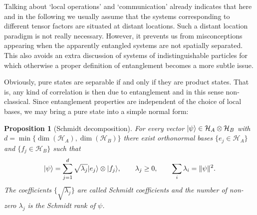 \documentclass[11pt,a4paper]{article}
\theoremstyle{plain}
\newtheorem{proposition}{Proposition}[section]
\theoremstyle{definition}
\theoremstyle{remark}
\numberwithin{equation}{section}
\begin{document}
Talking about `local operations' and `communication' already indicates that here and in the following we usually assume that the systems corresponding to different tensor factors are situated at distant locations. Such a distant location paradigm is not really necessary. However, it prevents us from misconceptions appearing when the apparently entangled systems are not spatially separated. This also avoids an extra discussion of systems of indistinguishable particles for which otherwise a proper definition of entanglement becomes a more subtle issue.

Obviously, pure states are separable if and only if they are product states. That is, any kind of correlation is then due to entanglement and in this sense non-classical. Since entanglement properties are independent of the choice of local bases, we may bring a pure state into a simple normal form:

\begin{proposition}[Schmidt decomposition]
    For every vector $|\psi\rangle\in \mathcal{H}_A\otimes \mathcal{H}_B$ with $d=\min\{\dim(\mathcal{H}_A),\dim(\mathcal{H}_B)\}$ there exist orthonormal bases $\{e_j\in \mathcal{H}_A\}$ and $\{f_j\in \mathcal{H}_B\}$ such that
    \begin{equation}
        |\psi\rangle=\sum_{j=1}^{d} \sqrt{\lambda_j} |e_j\rangle\otimes |f_j\rangle,
        \qquad
        \lambda_j\ge 0,
        \qquad
        \sum_i \lambda_i = \|\psi\|^2.
    \end{equation}
    The coefficients $\{\sqrt{\lambda_j}\}$ are called Schmidt coefficients and the number of non-zero $\lambda_j$ is the Schmidt rank of $\psi$.
\end{proposition}
\end{document}
